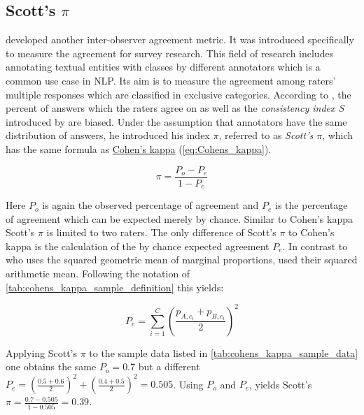 \subsection{Scott's $\pi$}
\label{chp:fundamentals:sec:inter_rater_agreement:subsec:scotts_pi}
\textcite{Scott:1955} developed another inter-observer agreement metric.
It was introduced specifically to measure the agreement for survey research.
This field of research includes annotating textual entities with classes by different annotators which is a common use case in \ac{NLP}.
Its aim is to measure the agreement among raters' multiple responses which are classified in exclusive categories.
According to \textcite{Scott:1955}, the percent of answers which the raters agree on as well as the \textit{consistency index S} introduced by \textcite{Bennett:1954} are biased.
Under the assumption that annotators have the same distribution of answers, he introduced his index $\pi$, referred to as \textit{Scott's $\pi$}, which has the same formula as \hyperref[chp:fundamentals:sec:inter_rater_agreement:subsec:cohens_kappa]{Cohen's kappa} (\cref{eq:Cohens_kappa}).

\begin{equation}\label{eq:Scotts_pi}
    \pi = \frac{P_o - P_e}{1 - P_e}
\end{equation}

Here $P_o$ is again the observed percentage of agreement and $P_e$ is the percentage of agreement which can be expected merely by chance.
Similar to Cohen's kappa Scott's $\pi$ is limited to two raters.
The only difference of Scott's $\pi$ to Cohen's kappa is the calculation of the by chance expected agreement $P_e$.
In contrast to \textcite{Cohen:1960} who uses the squared geometric mean of marginal proportions, \textcite{Scott:1955} used their squared arithmetic mean.
Following the notation of \cref{tab:cohens_kappa_sample_definition} this yields:

\begin{equation}\label{eq:Scotts_pi:p_e}
    P_e = \sum_{i=1}^{C} (\frac{p_{A, c_i} + p_{B, c_i}}{2})^2
\end{equation}

Applying Scott's $\pi$ to the sample data listed in \cref{tab:cohens_kappa_sample_data} one obtains the same $P_o=0.7$ but a different $P_e = (\frac{0.5 + 0.6}{2})^2 + (\frac{0.4+0.5}{2})^2 = 0.505$.
Using $P_o$ and $P_e$, yields Scott's $\pi = \frac{0.7 - 0.505}{1-0.505} = 0.\overline{39}$.
